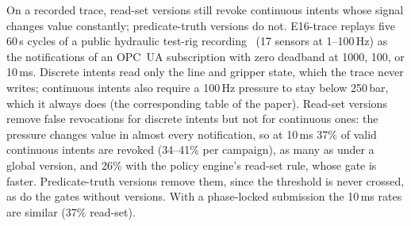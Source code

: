 \documentclass[11pt]{article}
\begin{document}
On a recorded trace, read-set versions still revoke continuous intents whose signal changes value constantly; predicate-truth versions do not. E16-trace replays five 60\,s cycles of a public hydraulic test-rig recording~ (17 sensors at 1--100\,Hz) as the notifications of an OPC~UA subscription with zero deadband at 1000, 100, or 10\,ms. Discrete intents read only the line and gripper state, which the trace never writes; continuous intents also require a 100\,Hz pressure to stay below 250\,bar, which it always does (the corresponding table of the paper). Read-set versions remove false revocations for discrete intents but not for continuous ones: the pressure changes value in almost every notification, so at 10\,ms 37\% of valid continuous intents are revoked (34--41\% per campaign), as many as under a global version, and 26\% with the policy engine's read-set rule, whose gate is faster. Predicate-truth versions remove them, since the threshold is never crossed, as do the gates without versions. With a phase-locked submission the 10\,ms rates are similar (37\% read-set).
\end{document}
